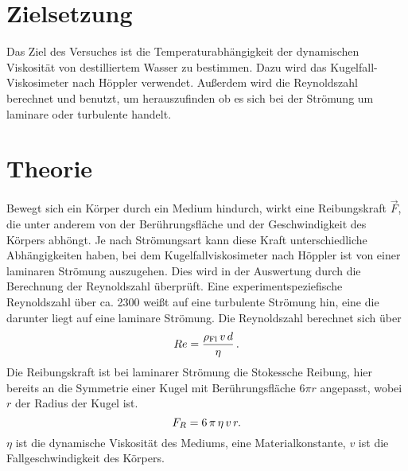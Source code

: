 \section{Zielsetzung}
\label{sec:Zielsetzung}
Das Ziel des Versuches ist die Temperaturabhängigkeit der dynamischen 
Viskosität von destilliertem Wasser zu bestimmen. Dazu wird das Kugelfall-
Viskosimeter nach Höppler verwendet. Außerdem wird die Reynoldszahl 
berechnet und benutzt, um herauszufinden ob es sich bei der Strömung um 
laminare oder turbulente handelt. 
\section{Theorie}
\label{sec:Theorie}
Bewegt sich ein Körper durch ein Medium hindurch, wirkt eine Reibungskraft 
$\vec{F}$, die unter anderem von der Berührungsfläche und der Geschwindigkeit
des Körpers abhöngt. Je nach Strömungsart kann diese Kraft 
unterschiedliche Abhängigkeiten haben, bei dem Kugelfallviskosimeter nach 
Höppler ist von einer laminaren Strömung auszugehen. 
Dies wird in der Auswertung durch die
Berechnung der Reynoldszahl überprüft. Eine experimentspeziefische 
Reynoldszahl über ca. 2300 weißt auf eine turbulente Strömung hin, eine die
darunter liegt auf eine laminare Strömung. Die Reynoldszahl berechnet sich
über 
\begin{equation}
Re = \frac{\rho_{\text{Fl}}\,v\,d}{\eta}\,. \\
\end{equation}
Die Reibungskraft ist bei laminarer Strömung die Stokessche Reibung, hier 
bereits an die Symmetrie einer Kugel mit Berührungsfläche $6 \pi r$
angepasst, wobei $r$ der Radius der Kugel ist. 
\begin{equation}
    F_{R} = 6\,\pi\,\eta\,v\,r. \\
\end{equation}
$\eta$ ist die dynamische Viskosität des Mediums, eine Materialkonstante,
$v$ ist die Fallgeschwindigkeit des Körpers. 
%
